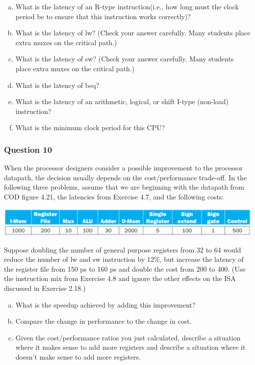\documentclass[11pt]{article}
\begin{document}
\begin{enumerate}[(a)]
    \item What is the latency of an R-type instruction(i.e., how long must the clock period be to ensure that this instruction works correctly)?
    \item What is the latency of lw? (Check your answer carefully. Many students place extra muxes on the critical path.)
    \item What is the latency of sw? (Check your answer carefully. Many students place extra muxes on the critical path.)
    \item What is the latency of beq?
    \item What is the latency of an arithmetic, logical, or shift I-type (non-load) instruction?
    \item What is the minimum clock period for this CPU?
\end{enumerate}


\setcounter{subsubsection}{9}
\subsubsection{Question 10}
When the processor designers consider a possible improvement to the processor datapath, the decision usually depends on the cost/performance trade-off. In the following three problems, assume that we are beginning with the datapath from COD figure 4.21, the latencies from Exercise 4.7, and the following costs:
\begin{center}\includegraphics[scale=0.6]{q10_image}\\\end{center}
Suppose doubling the number of general purpose registers from 32 to 64 would reduce the number of lw and sw instruction by 12\%, but increase the latency of the register file from 150 ps to 160 ps and double the cost from 200 to 400. (Use the instruction mix from Exercise 4.8 and ignore the other effects on the ISA discussed in Exercise 2.18.)

\begin{enumerate}[(a)]
    \item What is the speedup achieved by adding this improvement?
    \item Compare the change in performance to the change in cost.
    \item Given the cost/performance ratios you just calculated, describe a situation where it makes sense to add more registers and describe a situation where it doesn't make sense to add more registers.
\end{enumerate}
\end{document}
